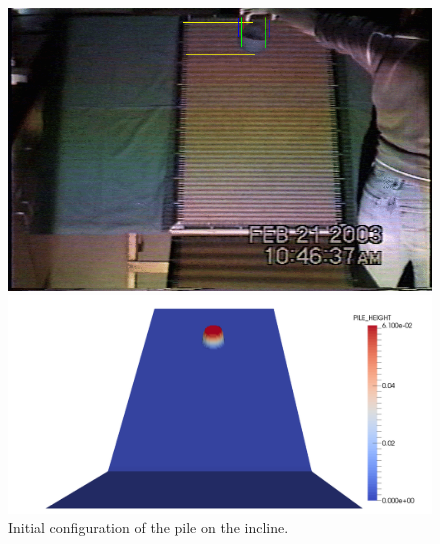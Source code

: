 \documentclass[letterpaper,10pt]{article}
\begin{document}
\begin{figure}[!ht]
        \begin{minipage}[b]{.5\linewidth}        
                \centering
                \includegraphics[width=1\textwidth]{IMAGES/expinitialconf.png}
        \end{minipage}
        \begin{minipage}[b]{.5\linewidth}
                \centering
                \includegraphics[width=1\textwidth]{IMAGES/initialconf.png}
        \end{minipage}
        \caption{Initial configuration of the pile on the incline.}
        \label{initialconf}
\end{figure}
\end{document}
